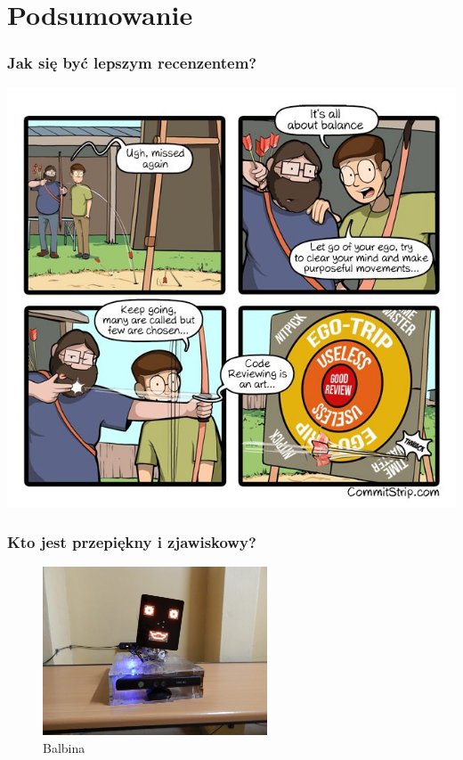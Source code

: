 \documentclass[xcolor=dvipsnames]{beamer}%
\begin{document}
\section{Podsumowanie}

\begin{frame}
	\frametitle{Jak się być lepszym recenzentem?}
	\centering \includegraphics[width=\textwidth,height=0.85\textheight,keepaspectratio]{figure/trening.jpeg}
\end{frame}

\begin{frame}
	\frametitle{Kto jest przepiękny i zjawiskowy?}
	\centering \begin{figure}
		\includegraphics[height=5cm]{figure/balbina.jpg}
		\caption{Balbina}
	\end{figure}
\end{frame}
\end{document}
